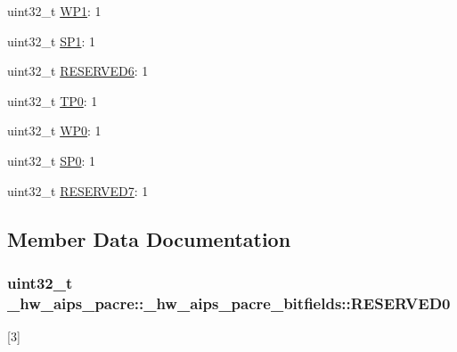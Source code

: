 \begin{DoxyCompactItemize}
\item 
uint32\+\_\+t \hyperlink{struct__hw__aips__pacre_1_1__hw__aips__pacre__bitfields_ac31ea8522b8ed3173a413dae43f976f5}{W\+P1}\+: 1
\item 
uint32\+\_\+t \hyperlink{struct__hw__aips__pacre_1_1__hw__aips__pacre__bitfields_a3c78bed8cb0c33272dd40d862fd39114}{S\+P1}\+: 1
\item 
uint32\+\_\+t \hyperlink{struct__hw__aips__pacre_1_1__hw__aips__pacre__bitfields_aff85c8f7774fe59a9b0e19575ffa8c39}{R\+E\+S\+E\+R\+V\+E\+D6}\+: 1
\item 
uint32\+\_\+t \hyperlink{struct__hw__aips__pacre_1_1__hw__aips__pacre__bitfields_a118ac9c4d20fb1afb9f687c1cdbb2233}{T\+P0}\+: 1
\item 
uint32\+\_\+t \hyperlink{struct__hw__aips__pacre_1_1__hw__aips__pacre__bitfields_af6687cdb29e52dd8149f62719970f676}{W\+P0}\+: 1
\item 
uint32\+\_\+t \hyperlink{struct__hw__aips__pacre_1_1__hw__aips__pacre__bitfields_a7cb169f8ca243acff137529f994ecebb}{S\+P0}\+: 1
\item 
uint32\+\_\+t \hyperlink{struct__hw__aips__pacre_1_1__hw__aips__pacre__bitfields_a26e1dfe6f54c5da1d99cd93806224564}{R\+E\+S\+E\+R\+V\+E\+D7}\+: 1
\end{DoxyCompactItemize}


\subsection{Member Data Documentation}
\subsubsection[{\texorpdfstring{R\+E\+S\+E\+R\+V\+E\+D0}{RESERVED0}}]{\setlength{\rightskip}{0pt plus 5cm}uint32\+\_\+t \+\_\+hw\+\_\+aips\+\_\+pacre\+::\+\_\+hw\+\_\+aips\+\_\+pacre\+\_\+bitfields\+::\+R\+E\+S\+E\+R\+V\+E\+D0}\hypertarget{struct__hw__aips__pacre_1_1__hw__aips__pacre__bitfields_a55627b03a5149af75072b058673a6cf6}{}\label{struct__hw__aips__pacre_1_1__hw__aips__pacre__bitfields_a55627b03a5149af75072b058673a6cf6}
\mbox{[}3\mbox{]} 

